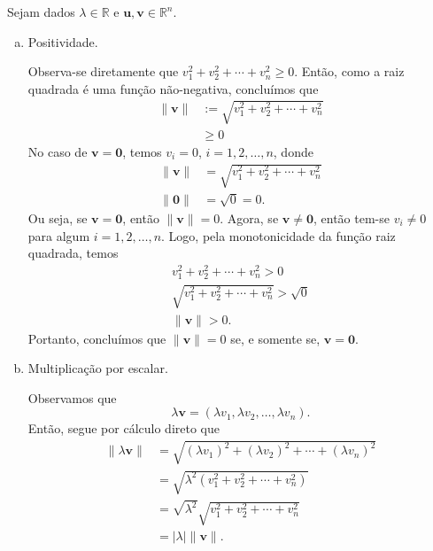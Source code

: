 \begin{dem}
  Sejam dados $\lambda\in\mathbb{R}$ e $\pmb{u},\pmb{v}\in\mathbb{R}^n$.  
  \begin{enumerate}[a)]
  \item Positividade.

    Observa-se diretamente que $v_1^2+v_2^2+\cdots + v_n^2\geq 0$. Então, como a raiz quadrada é uma função não-negativa, concluímos que
    \begin{equation}
      \begin{aligned}
        \|\pmb{v}\| &:= \sqrt{v_1^2+v_2^2+\cdots + v_n^2}\\
        &\geq 0
      \end{aligned}
    \end{equation}
    No caso de $\pmb{v} = \pmb{0}$, temos $v_i=0$, $i = 1, 2, \dotsc, n$, donde
    \begin{equation}
      \begin{aligned}
        \|\pmb{v}\| &= \sqrt{v_1^2+v_2^2+\cdots + v_n^2}\\
        \|\pmb{0}\| &= \sqrt{0} = 0.
      \end{aligned}
    \end{equation}
    Ou seja, se $\pmb{v} = \pmb{0}$, então $\|\pmb{v}\| = 0$. Agora, se $\pmb{v}\neq \pmb{0}$, então tem-se $v_i\neq 0$ para algum $i=1, 2, \dotsc, n$. Logo, pela monotonicidade da função raiz quadrada, temos
      \begin{gather}
        v_1^2+v_2^2+\cdots + v_n^2 > 0\\
        \sqrt{v_1^2+v_2^2+\cdots + v_n^2} > \sqrt{0}\\
        \|\pmb{v}\| > 0.
      \end{gather}
      Portanto, concluímos que $\|\pmb{v}\| = 0$ se, e somente se, $\pmb{v} = \pmb{0}$.
      
    \item Multiplicação por escalar.
      
    Observamos que
    \begin{equation}
      \lambda\pmb{v} = (\lambda v_1, \lambda v_2, \dotsc, \lambda v_n).
    \end{equation}
    Então, segue por cálculo direto que
    \begin{align}
      \|\lambda\pmb{v}\| &= \sqrt{(\lambda v_1)^2 + (\lambda v_2)^2 + \cdots + (\lambda v_n)^2}\\
                         &= \sqrt{\lambda^2(v_1^2 + v_2^2 + \cdots + v_n^2)}\\
                         &= \sqrt{\lambda^2}\sqrt{v_1^2 + v_2^2 + \cdots + v_n^2}\\
                         &= |\lambda|\|\pmb{v}\|.
    \end{align}


\end{enumerate}
\end{dem}
